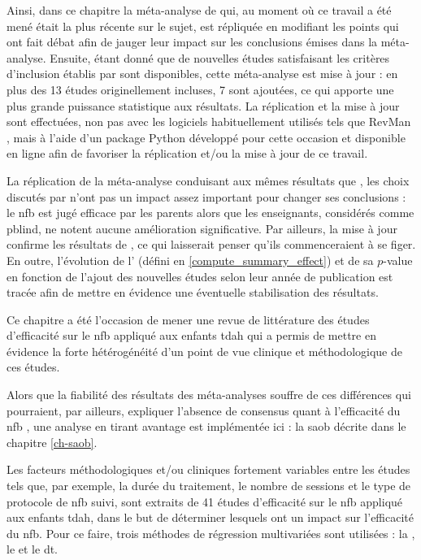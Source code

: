 Ainsi, dans ce chapitre la méta-analyse de \citet{Cortese2016} qui, au moment où ce travail a été mené était la plus récente sur le sujet, 
est répliquée en modifiant les points qui ont fait débat \citep{Micoulaud2016} afin de jauger leur impact sur les conclusions émises dans la méta-analyse. 
Ensuite, étant donné que de nouvelles études satisfaisant les critères d'inclusion établis par \citet{Cortese2016} sont disponibles, cette méta-analyse 
est mise à jour : en plus des 13 études originellement incluses, 7 sont ajoutées, ce qui apporte une plus grande puissance statistique aux résultats. 
La réplication et la mise à jour sont effectuées, non pas avec les logiciels 
habituellement utilisés tels que RevMan \citep{Revman}, mais à l'aide d'un package Python développé pour cette occasion et disponible en ligne afin de favoriser 
la réplication et/ou la mise à jour de ce travail. 

La réplication de la méta-analyse conduisant aux mêmes résultats que \citet{Cortese2016}, les choix discutés par \citet{Micoulaud2016} n'ont pas un impact assez
important pour changer ses conclusions : le \gls{nfb} est jugé efficace par les parents alors que les enseignants, considérés comme \gls{pblind}, ne notent aucune
amélioration significative. Par ailleurs, la mise à jour confirme les résultats de \citet{Cortese2016}, ce qui laisserait penser qu'ils commenceraient
à se figer. En outre, l'évolution de l' (défini en \ref{compute_summary_effect}) et de sa $p$-value en fonction de l'ajout des nouvelles études selon
leur année de publication est tracée afin de mettre en évidence une éventuelle stabilisation des résultats. 

Ce chapitre a été l'occasion de mener une revue de littérature des études d'efficacité sur le \gls{nfb} appliqué aux enfants \gls{tdah} 
qui a permis de mettre en évidence la forte hétérogénéité d'un point de vue clinique et méthodologique de ces études. 

Alors que la fiabilité des résultats des méta-analyses souffre de ces différences qui pourraient, par ailleurs, expliquer l'absence de consensus quant 
à l'efficacité du \gls{nfb} \citep{Alkoby2017}, une analyse en tirant avantage est implémentée ici : la \gls{saob} décrite dans le chapitre \ref{ch-saob}. 

Les facteurs méthodologiques et/ou cliniques fortement variables entre les études tels que, par exemple, la durée du traitement, le nombre de sessions et le type 
de protocole de \gls{nfb} suivi, sont extraits de 41 études d'efficacité sur le \gls{nfb} appliqué aux enfants \gls{tdah}, dans le but de déterminer lesquels 
ont un impact sur l'efficacité du \gls{nfb}. Pour ce faire, trois méthodes de régression multivariées sont utilisées : la , le  et le \gls{dt}. 

